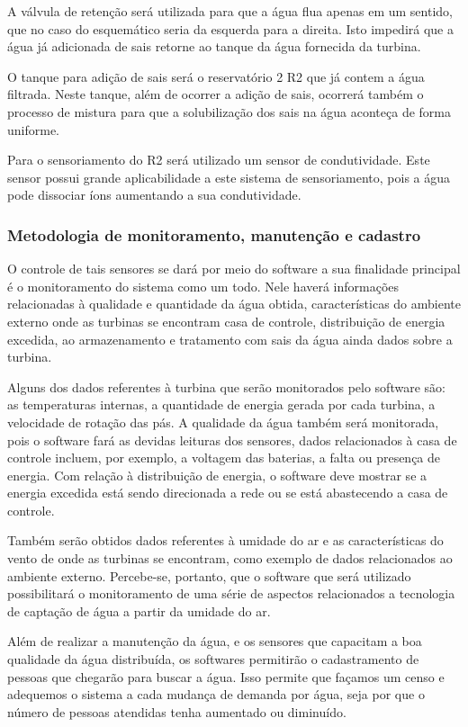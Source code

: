 A válvula de retenção será utilizada para que a água flua apenas em um sentido, que no caso do esquemático seria da esquerda para a direita. Isto impedirá que a água já adicionada de sais retorne ao tanque da água fornecida da turbina.

O tanque para adição de sais será o reservatório 2 R2 que já contem  a água filtrada. Neste tanque, além de ocorrer a adição de sais, ocorrerá também o processo de mistura para que a solubilização dos sais na água aconteça de forma uniforme.

Para o sensoriamento do R2 será utilizado um sensor de condutividade. Este sensor possui grande aplicabilidade a este sistema de sensoriamento, pois a água pode dissociar íons aumentando a sua condutividade.

	\subsubsection{Metodologia de monitoramento, manutenção e cadastro}
	O controle de tais sensores se dará por meio do software a sua finalidade principal é o monitoramento do sistema como um todo. Nele haverá informações relacionadas à qualidade e quantidade da água obtida, características do ambiente externo onde as turbinas se encontram casa de controle, distribuição de energia excedida, ao armazenamento e tratamento com sais da água ainda dados sobre a turbina.
	 
Alguns dos dados referentes à turbina que serão monitorados pelo software são: as temperaturas internas, a quantidade de energia gerada por cada turbina, a velocidade de rotação das pás. A qualidade da água também será monitorada, pois o software fará as devidas leituras dos sensores, dados relacionados à casa de controle incluem, por exemplo, a voltagem das baterias, a falta ou presença de energia. Com relação à distribuição de energia, o software deve mostrar se a energia excedida está sendo direcionada a rede ou se está abastecendo a casa de controle.

 Também serão obtidos dados referentes à umidade do ar e as características do vento de onde as turbinas se encontram, como exemplo de dados relacionados ao ambiente externo. Percebe-se, portanto, que o software que será utilizado possibilitará o monitoramento de uma série de aspectos relacionados a tecnologia de captação de água a partir da umidade do ar.

Além de realizar a manutenção da água, e os sensores que capacitam a boa qualidade da água distribuída, os softwares permitirão o cadastramento de pessoas que chegarão para buscar a água. Isso permite que façamos um censo e adequemos o sistema a cada mudança de demanda por água, seja por que o número de pessoas atendidas tenha aumentado ou diminuído.

